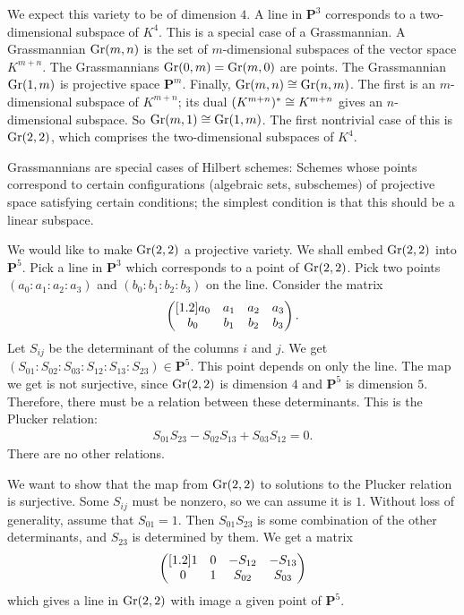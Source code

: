 \documentclass [11 pt, oneside] {article}
\begin{document}
\begin{example}\label{}
We expect this variety to be of dimension $4$. A line in $\mathbf{P}^3$ corresponds to a two-dimensional subspace of $K^4$. This is a special case of a Grassmannian. A Grassmannian $\operatorname{Gr}(m,n)$ is the set of $m$-dimensional subspaces of the vector space $K^{m+n}$. The Grassmannians $\operatorname{Gr}(0,m)=\operatorname{Gr} (m,0)$ are points. The Grassmannian $\operatorname{Gr}(1,m)$ is projective space $\mathbf{P}^m$. Finally, $\operatorname{Gr}(m,n)\cong \operatorname{Gr} (n,m)$. The first is an $m$-dimensional subspace of $K^{m+n}$; its dual $(K^{m+n})^*\cong K^{m+n}$ gives an $n$-dimensional subspace. So $\operatorname{Gr}(m,1)\cong \operatorname{Gr}(1,m)$. The first nontrivial case of this is $\operatorname{Gr}(2,2)$, which comprises the two-dimensional subspaces of $K^4$.

Grassmannians are special cases of Hilbert schemes: Schemes whose points correspond to certain configurations (algebraic sets, subschemes) of projective space satisfying certain conditions; the simplest condition is that this should be a linear subspace.

We would like to make $\operatorname{Gr}(2,2)$ a projective variety. We shall embed $\operatorname{Gr}(2,2)$ into $\mathbf{P}^5$. Pick a line in $\mathbf{P}^3$ which corresponds to a point of $\operatorname{Gr}(2,2)$. Pick two points $(a_0:a_1:a_2:a_3)$ and $(b_0:b_1:b_2:b_3)$ on the line. Consider the matrix
\begin{align*}
	\begin{pmatrix} [1.2] a_0&a_1&a_2&a_3\\b_0&b_1&b_2&b_3\end{pmatrix}.
\end{align*}
Let $S_{ij}$ be the determinant of the columns $i$ and $j$. We get $(S_{01}:S_{02}:S_{03}:S_{12}:S_{13}:S_{23}) \in \mathbf{P}^5$. This point depends on only the line. The map we get is not surjective, since $\operatorname{Gr}(2,2)$ is dimension $4$ and $\mathbf{P}^5$ is dimension $5$. Therefore, there must be a relation between these determinants. This is the Plucker relation:
\begin{align*}
	S_{01}S_{23}-S_{02}S_{13}+S_{03}S_{12}=0.
\end{align*}
There are no other relations.

We want to show that the map from $\operatorname{Gr}(2,2)$ to solutions to the Plucker relation is surjective. Some $S_{ij}$ must be nonzero, so we can assume it is $1$. Without loss of generality, assume that $S_{01}=1$. Then $S_{01}S_{23}$ is some combination of the other determinants, and $S_{23}$ is determined by them. We get a matrix
\begin{align*}
	\begin{pmatrix} [1.2] 1&0&-S_{12}&-S_{13}\\0&1&S_{02}&S_{03}\end{pmatrix}
\end{align*}
which gives a line in $\operatorname{Gr}(2,2)$ with image a given point of $\mathbf{P}^5$.
\end{example}
\end{document}

